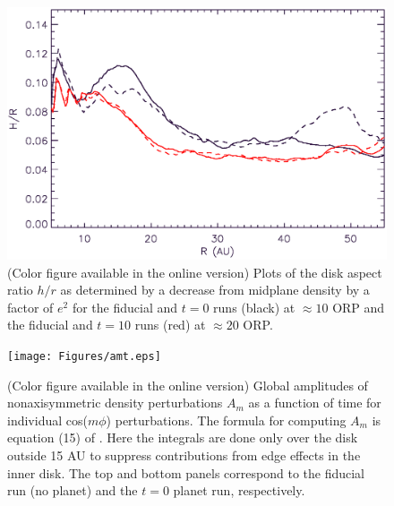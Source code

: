 \documentclass[12pt,manuscript,authoryear]{aastex}
\begin{document}



\newpage

\begin{figure}[t]
\center
\includegraphics[width=12cm]{Figures/hr_migration.eps}
\caption{(Color figure available in the online version) Plots of the disk aspect ratio $h/r$ as determined by a decrease
  from midplane density by a factor of $e^2$ for the fiducial and $t=0$ runs (black) at $\approx 10$ ORP and the fiducial and
  $t=10$ runs (red) at $\approx 20$ ORP.}
\label{fig:hr}
\end{figure}

\begin{figure}[t]
\center
\texttt{[image: Figures/amt.eps]}
\caption{(Color figure available in the online version) Global amplitudes of nonaxisymmetric density perturbations $A_m$
  as a function of time for individual cos($m\phi$) perturbations. The formula for computing $A_m$ is equation (15) of
  \citep{boley2006}. Here the integrals are done only over the disk outside 15 AU to suppress contributions from edge
  effects in the inner disk. The top and bottom panels correspond to the fiducial run (no planet) and the $t = 0$ planet
  run, respectively.}
\label{fig:Am}
\end{figure}
\end{document}
